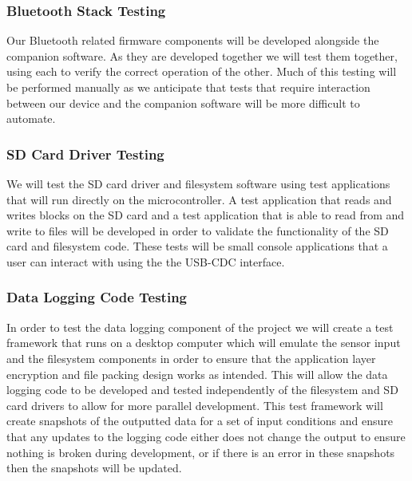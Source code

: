 \subsubsection{Bluetooth Stack Testing}

Our Bluetooth related firmware components will be developed alongside the
companion software. As they are developed together we will test them together,
using each to verify the correct operation of the other. Much of this testing
will be performed manually as we anticipate that tests that require interaction
between our device and the companion software will be more difficult to
automate.

\subsubsection{SD Card Driver Testing}

We will test the SD card driver and filesystem software using test applications
that will run directly on the microcontroller. A test application that reads
and writes blocks on the SD card and a test application that is able to read
from and write to files will be developed in order to validate the functionality
of the SD card and filesystem code. These tests will be small console
applications that a user can interact with using the the USB-CDC interface.

\subsubsection{Data Logging Code Testing}

In order to test the data logging component of the project we will create a test
framework that runs on a desktop computer which will emulate the sensor input
and the filesystem components in order to ensure that the application layer
encryption and file packing design works as intended. This will allow the data
logging code to be developed and tested independently of the filesystem and SD
card drivers to allow for more parallel development. This test framework will
create snapshots of the outputted data for a set of input conditions and ensure
that any updates to the logging code either does not change the output to ensure
nothing is broken during development, or if there is an error in these snapshots
then the snapshots will be updated.

\fi
